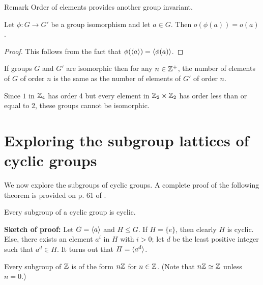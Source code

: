 \begin{df}{Remark}
Order of elements provides another group invariant.\end{df}

\begin{thm}\label{ophia} Let $\phi:G\to G'$ be a group isomorphism and let $a\in G$.  Then $o(\phi(a))=o(a)$.
\end{thm}

\begin{proof} This follows from the fact that $\phi(\langle a\rangle)=\langle\phi(a)\rangle$.\end{proof}


\begin{cor}\label{} If groups $G$ and $G'$ are isomorphic then for any $n\in \mathbb{Z}^+$, the number of elements of $G$ of order $n$ is the same as the number of elements of $G'$ of order $n$. \end{cor}


\begin{example}{} Since $1$ in $\mathbb{Z}_4$ has order 4 but every element in $\mathbb{Z}_2 \times \mathbb{Z}_2$ has order less than or equal to 2, these groups cannot be isomorphic. \end{example}



\bigskip
\section{Exploring the subgroup lattices of cyclic groups}

We now explore the subgroups of cyclic groups. A complete proof of the following theorem is provided on p. 61 of \cite{F}.

\begin{thm}\label{subc} Every subgroup of a cyclic group is cyclic.
\end{thm}

\textbf{Sketch of proof:} Let $G=\langle a\rangle$ and $H\leq G$. If $H=\{e\}$, then clearly $H$ is cyclic.  Else, there exists an element $a^i$ in $H$ with $i>0$; let $d$ be the least positive integer such that $a^d\in H$. It turns out that $H=\langle a^d\rangle$.
\bigskip
\begin{cor}\label{} Every subgroup of $\mathbb{Z}$ is of the form $n\mathbb{Z}$ for $n\in \mathbb{Z}$. (Note that $n\mathbb{Z}\simeq \mathbb{Z}$ unless $n=0$.) \end{cor}

